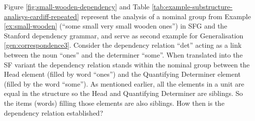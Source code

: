     Figure \ref{fig:small-wooden-dependency} and Table \ref{tab:example-substructure-analisys-cardiff-repeated} represent the analysis of a nominal group from Example \ref{ex:small-wooden} (``some small very small wooden ones'') in SFG and the Stanford dependency grammar, and serve as second example for Generalisation \ref{gen:correspondence3}. Consider the dependency relation ``det'' acting as a link between the noun ``ones'' and the determiner ``some''. When translated into the SF variant the dependency relation stands within the nominal group between the Head element (filled by word ``ones'') and the Quantifying Determiner element (filled by the word ``some''). As mentioned earlier, all the elements in a unit are equal in the structure so the Head and Quantifying Determiner are siblings. So the items (words) filling those elements are also siblings. How then is the dependency relation established? 




